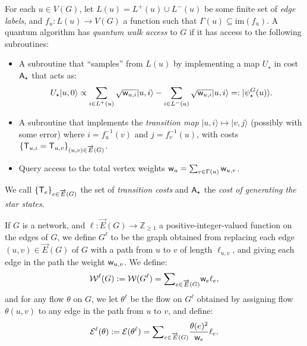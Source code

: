 \documentclass{theoretics}
\def\ket#1{{\lvert}#1\rangle}
\renewcommand{\>}{\rangle}
\newcommand{\<}{\langle}
\renewcommand{\(}{\left(}
\renewcommand{\)}{\right)}
\def\w{{\sf w}}
\begin{document}
\begin{definition}\label{def:QW-access}
For each $u\in V(G)$, let $L(u)=L^+(u)\cup L^-(u)$ be some finite set of \emph{edge labels}, and $f_u:L(u)\rightarrow V(G)$ a function such that $\Gamma(u)\subseteq \mathrm{im}(f_u)$. 
A quantum algorithm has \emph{quantum walk access} to $G$ if it has access to the following subroutines:
\begin{itemize}
\item A subroutine that ``samples'' from $L(u)$ by implementing a map $U_\star$ in cost ${\sf A}_\star$ that acts as:
\begin{equation*}
U_\star\ket{u,0} \propto \sum_{i\in L^+(u)}\sqrt{\w_{u,i}}\ket{u,i}-\sum_{i\in L^-(u)}\sqrt{\w_{u,i}}\ket{u,i} =: \ket{\psi_\star^G(u)}.
\end{equation*}
\item A subroutine that implements the \emph{transition map}
$
\ket{u,i}\mapsto \ket{v,j}
$
(possibly with some error) where $i=f^{-1}_u(v)$ and $j=f^{-1}_v(u)$, with costs $\{{\sf T}_{u,i}={\sf T}_{u,v}\}_{(u,v)\in\overrightarrow{E}(G)}$. 

\item Query access to the total vertex weights $\w_u=\sum_{v\in\Gamma(u)}\w_{u,v}$. 
\end{itemize}
We call $\{{\sf T}_e\}_{e\in\overrightarrow{E}(G)}$ the set of \emph{transition costs} and ${\sf A}_\star$ the \emph{cost of generating the star states}. 
\end{definition}





\begin{definition}\label{def:nwk-length}
If $G$ is a network, and $\ell:\overrightarrow{E}(G)\rightarrow\mathbb{Z}_{\geq 1}$ a positive-integer-valued function on the edges of $G$, we define $G^{\ell}$ to be the graph obtained from replacing each edge $(u,v)\in \overrightarrow{E}(G)$ of $G$ with a path from $u$ to $v$ of length $\ell_{u,v}$, and giving each edge in the path the weight $\w_{u,v}$. We define:
\begin{equation*}
{\cal W}^{\ell}(G):={\cal W}(G^\ell)=\textstyle{\displaystyle\sum}_{e\in \overrightarrow{E}(G)}\w_e\ell_e,
\end{equation*}
and for any flow $\theta$ on $G$, we let $\theta^{\ell}$ be the flow on $G^{\ell}$ obtained by assigning flow $\theta(u,v)$ to any edge in the path from $u$ to $v$, and define:
\begin{equation*}
{\cal E}^{\ell}(\theta):={\cal E}(\theta^{\ell})=\textstyle{\displaystyle\sum}_{e\in \overrightarrow{E}(G)}\displaystyle\frac{\theta(e)^2}{\w_e}\ell_e.
\end{equation*}
\end{definition}
\end{document}
